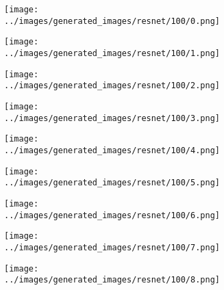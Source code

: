 \begin{figure}[H]
  \centering
 \captionsetup[subfigure]{labelformat=empty}
  \begin{subfigure}[b]{0.1\textwidth}
      \centering
      \texttt{[image: ../images/generated\_images/resnet/100/0.png]}
  \end{subfigure}
  \hspace{1em}%
  \begin{subfigure}[b]{0.1\textwidth}
      \centering
      \texttt{[image: ../images/generated\_images/resnet/100/1.png]}
  \end{subfigure}
  \hspace{1em}%
  \begin{subfigure}[b]{0.1\textwidth}
      \centering
      \texttt{[image: ../images/generated\_images/resnet/100/2.png]}
  \end{subfigure}
  \hspace{1em}%
  \begin{subfigure}[b]{0.1\textwidth}
   \centering
   \texttt{[image: ../images/generated\_images/resnet/100/3.png]}
 \end{subfigure}
 \hspace{1em}%
 \begin{subfigure}[b]{0.1\textwidth}
   \centering
   \texttt{[image: ../images/generated\_images/resnet/100/4.png]}
 \end{subfigure}
 \hspace{1em}%
 \begin{subfigure}[b]{0.1\textwidth}
   \centering
   \texttt{[image: ../images/generated\_images/resnet/100/5.png]}
 \end{subfigure}
 \hspace{1em}%
 \begin{subfigure}[b]{0.1\textwidth}
   \centering
   \texttt{[image: ../images/generated\_images/resnet/100/6.png]}
 \end{subfigure}
 \hspace{1em}%
 \begin{subfigure}[b]{0.1\textwidth}
  \centering
  \texttt{[image: ../images/generated\_images/resnet/100/7.png]}
\end{subfigure}
\hspace{1em}%
 \begin{subfigure}[b]{0.1\textwidth}
 \centering
 \texttt{[image: ../images/generated\_images/resnet/100/8.png]}

\end{subfigure}
\end{figure}
